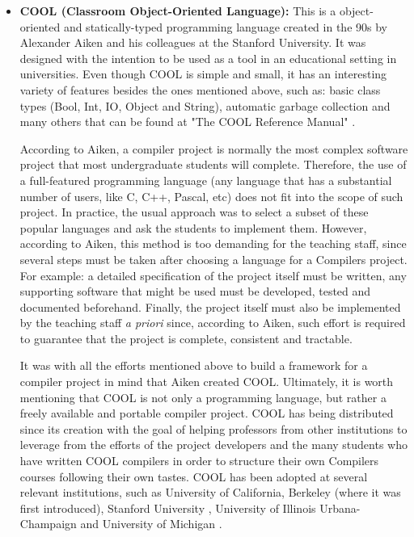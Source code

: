 \begin{itemize}
    \item \textbf{COOL (Classroom Object-Oriented Language):} This is a object-oriented and statically-typed programming language \cite{aiken1996cool} created in the 90s by Alexander Aiken and his colleagues at the Stanford University. It was designed with the intention to be used as a tool in an educational setting in universities. Even though COOL is simple and small, it has an interesting variety of features besides the ones mentioned above, such as: basic class types (Bool, Int, IO, Object and String), automatic garbage collection and many others that can be found at "The COOL Reference Manual" \cite{cool_reference_manual}.
    
    According to Aiken, a compiler project is normally the most complex software project that most undergraduate students will complete. Therefore, the use of a full-featured programming language (any language that has a substantial number of users, like C, C++, Pascal, etc) does not fit into the scope of such project. In practice, the usual approach was to select a subset of these popular languages and ask the students to implement them. However, according to Aiken, this method is too demanding for the teaching staff, since several steps must be taken after choosing a language for a Compilers project. For example: a detailed specification of the project itself must be written, any supporting software that might be used must be developed, tested and documented beforehand. Finally, the project itself must also be implemented by the teaching staff \textit{a priori} since, according to Aiken, such effort is required to guarantee that the project is complete, consistent and tractable.
    
    It was with all the efforts mentioned above to build a framework for a compiler project  in mind that Aiken created COOL. Ultimately, it is worth mentioning that COOL is not only a programming language, but rather a freely available and portable compiler project. COOL has being distributed since its creation with the goal of helping professors from other institutions to leverage from the efforts of the project developers and the many students who have written COOL compilers in order to structure their own Compilers courses following their own tastes. COOL has been adopted at several relevant institutions, such as University of California, Berkeley \cite{aiken1996cool} (where it was first introduced), Stanford University \cite{stanford_cs143_compilers_course_page}, University of Illinois Urbana-Champaign \cite{university_of_illinois_urbana_champaign_compilers_course_page} and University of Michigan \cite{university_of_michigan_compiler_construction_course_page}.
    

\end{itemize}
